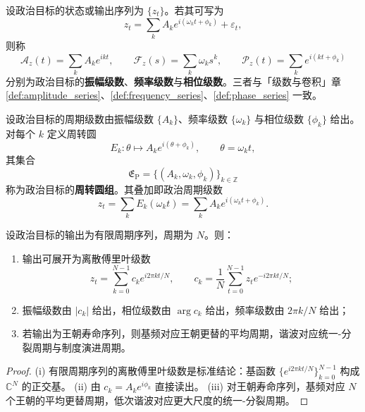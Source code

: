 \begin{definition}\label{def:politics_series}
设政治目标的状态或输出序列为 $\{z_t\}$。若其可写为
\[
z_t=\sum_k A_k e^{i(\omega_k t+\phi_k)}+\varepsilon_t,
\]
则称
\[
\mathcal A_z(t)=\sum_k A_k e^{ikt},\qquad
\mathcal F_z(s)=\sum_k \omega_k s^k,\qquad
\mathcal P_z(t)=\sum_k e^{i(kt+\phi_k)}
\]
分别为政治目标的\textbf{振幅级数}、\textbf{频率级数}与\textbf{相位级数}。三者与「级数与卷积」章 \cref{def:amplitude_series}、\cref{def:frequency_series}、\cref{def:phase_series} 一致。
\end{definition}

\begin{definition}[政治周转圆组]\label{def:politics_epicycle_group}
设政治目标的周期级数由振幅级数 $\{A_k\}$、频率级数 $\{\omega_k\}$ 与相位级数 $\{\phi_k\}$ 给出。对每个 $k$ 定义周转圆
\[
E_k:\theta\mapsto A_k e^{i(\theta+\phi_k)},\qquad \theta=\omega_k t,
\]
其集合
\[
\mathfrak E_{\mathrm{P}}=\{(A_k,\omega_k,\phi_k)\}_{k\in\mathbb Z}
\]
称为政治目标的\textbf{周转圆组}。其叠加即政治周期级数
\[
z_t=\sum_k E_k(\omega_k t)=\sum_k A_k e^{i(\omega_k t+\phi_k)}.
\]
\end{definition}

\begin{theorem}[由政治数据构建周期级数]\label{thm:politics_series_reconstruction}
设政治目标的输出为有限周期序列，周期为 $N$。则：
\begin{enumerate}[label=(\roman*)]
    \item 输出可展开为离散傅里叶级数
    \[
    z_t=\sum_{k=0}^{N-1}c_k e^{i2\pi kt/N},\qquad
    c_k=\frac1N\sum_{t=0}^{N-1}z_t e^{-i2\pi kt/N};
    \]
    \item 振幅级数由 $|c_k|$ 给出，相位级数由 $\arg c_k$ 给出，频率级数由 $2\pi k/N$ 给出；
    \item 若输出为王朝寿命序列，则基频对应王朝更替的平均周期，谐波对应统一-分裂周期与制度演进周期。
\end{enumerate}
\end{theorem}

\begin{proof}
(i) 有限周期序列的离散傅里叶级数是标准结论：基函数 $\{e^{i2\pi kt/N}\}_{k=0}^{N-1}$ 构成 $\mathbb C^N$ 的正交基。
(ii) 由 $c_k=A_k e^{i\phi_k}$ 直接读出。
(iii) 对王朝寿命序列，基频对应 $N$ 个王朝的平均更替周期，低次谐波对应更大尺度的统一-分裂周期。
\end{proof}

